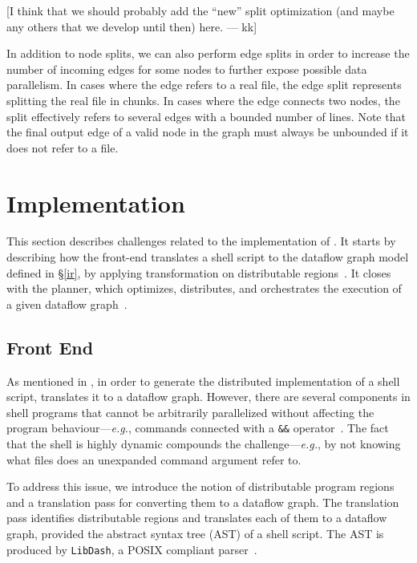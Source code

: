 \documentclass[sigplan,10pt,review,anonymous]{acmart}
\newcommand{\eg}{{\em e.g.}, }
\newcommand{\ttt}[1]{\texttt{\small #1}}
\newcommand{\kk}[1]{[{\color{magenta}#1 --- kk}]}
\begin{document}
\kk{I think that we should probably add the ``new'' split optimization
  (and maybe any others that we develop until then) here.}

In addition to node splits, we can also perform edge splits in order
to increase the number of incoming edges for some nodes to further expose
possible data parallelism. In cases where the edge refers to a real file, the
edge split represents splitting the real file in chunks. In
cases where the edge connects two nodes, the split effectively refers to several edges
with a bounded number of lines. Note that the final output edge of a
valid node in the graph must always be unbounded if it does not refer
to a file.

\section{Implementation}
\label{impl}

This section describes challenges related to the implementation of \sys. 
It starts by describing how the \sys front-end translates a shell script to the dataflow graph model defined in \S\ref{ir}, by applying transformation on distributable regions~.
It closes with the \sys planner, which  optimizes, distributes, and orchestrates the execution of a given dataflow graph~.

\subsection{Front End}
\label{front-end}

As mentioned in , in order to generate the distributed implementation of a shell script, \sys translates it to a dataflow graph.
However, there are several components in shell programs that cannot be arbitrarily parallelized without affecting the program behaviour---\eg commands connected with a \ttt{\&\&} operator~.
The fact that the shell is highly dynamic compounds the challenge---\eg by not knowing what files does an unexpanded command argument refer to.


To address this issue, we introduce the notion of distributable program regions and a translation pass for converting them to a dataflow graph.
The translation pass identifies distributable regions and translates each of them to a dataflow graph, provided the abstract syntax tree (AST) of a shell script.
The AST is produced by \ttt{LibDash}, a POSIX compliant parser~\cite{libdash}.
\end{document}
